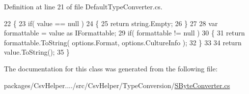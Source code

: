 Definition at line 21 of file Default\-Type\-Converter.\-cs.


\begin{DoxyCode}
22         \{
23             \textcolor{keywordflow}{if}( value == null )
24             \{
25                 \textcolor{keywordflow}{return} string.Empty;
26             \}
27 
28             var formattable = value as IFormattable;
29             \textcolor{keywordflow}{if}( formattable != null )
30             \{
31                 \textcolor{keywordflow}{return} formattable.ToString( options.Format, options.CultureInfo );
32             \}
33 
34             \textcolor{keywordflow}{return} value.ToString();
35         \}
\end{DoxyCode}


The documentation for this class was generated from the following file\-:\begin{DoxyCompactItemize}
\item 
packages/\-Csv\-Helper..../src/\-Csv\-Helper/\-Type\-Conversion/\hyperlink{a00256}{S\-Byte\-Converter.\-cs}\end{DoxyCompactItemize}
